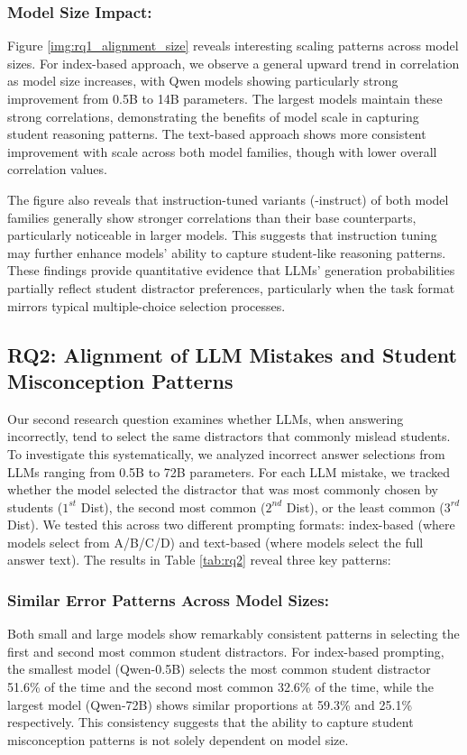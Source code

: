 

\subsubsection{Model Size Impact:} Figure \ref{img:rq1_alignment_size} reveals interesting scaling patterns across model sizes. For index-based approach, we observe a general upward trend in correlation as model size increases, with Qwen models showing particularly strong improvement from 0.5B to 14B parameters. The largest models maintain these strong correlations, demonstrating the benefits of model scale in capturing student reasoning patterns. The text-based approach shows more consistent improvement with scale across both model families, though with lower overall correlation values.

The figure also reveals that instruction-tuned variants (-instruct) of both model families generally show stronger correlations than their base counterparts, particularly noticeable in larger models. This suggests that instruction tuning may further enhance models' ability to capture student-like reasoning patterns. These findings provide quantitative evidence that LLMs' generation probabilities partially reflect student distractor preferences, particularly when the task format mirrors typical multiple-choice selection processes.



\subsection{RQ2: Alignment of LLM Mistakes and Student Misconception Patterns}

Our second research question examines whether LLMs, when answering incorrectly, tend to select the same distractors that commonly mislead students. To investigate this systematically, we analyzed incorrect answer selections from LLMs ranging from 0.5B to 72B parameters. For each LLM mistake, we tracked whether the model selected the distractor that was most commonly chosen by students ($1^{st}$ Dist), the second most common ($2^{nd}$ Dist), or the least common ($3^{rd}$ Dist). We tested this across two different prompting formats: index-based (where models select from A/B/C/D) and text-based (where models select the full answer text). The results in Table \ref{tab:rq2} reveal three key patterns:

\subsubsection{Similar Error Patterns Across Model Sizes:} Both small and large models show remarkably consistent patterns in selecting the first and second most common student distractors. For index-based prompting, the smallest model (Qwen-0.5B) selects the most common student distractor 51.6\% of the time and the second most common 32.6\% of the time, while the largest model (Qwen-72B) shows similar proportions at 59.3\% and 25.1\% respectively. This consistency suggests that the ability to capture student misconception patterns is not solely dependent on model size.


